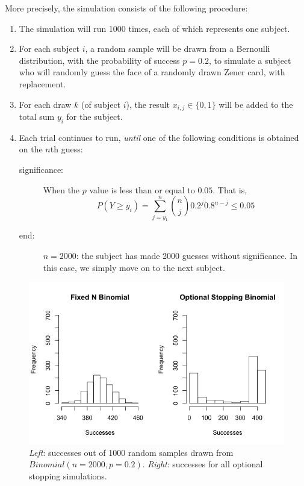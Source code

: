 More precisely, the simulation consists of the following procedure: 
\begin{enumerate}
	\item The simulation will run 1000 times, each of which represents one subject. 
	\item For each subject $i$, a random sample will be drawn from a Bernoulli distribution, with the probability of success $p=0.2$, to simulate a subject who will randomly guess the face of a randomly drawn Zener card, with replacement. 
	\item For each draw $k$ (of subject $i$), the result $x_{i,j}\in \{0,1\}$ will be added to the total sum $y_i$ for the subject.
	\item Each trial continues to run, \emph{until} one of the following conditions is obtained on the $n$th guess:\begin{description}
		\item[significance:] When the $p$ value is less than or equal to $0.05$. That is, 
		$$P(Y\geq y_i) = \sum_{j=y_1}^n {n \choose j} 0.2^j 0.8^{n-j}\leq 0.05$$
		\item[end:] $n=2000$: the subject has made 2000 guesses without significance. In this case, we simply move on to the next subject.
	\end{description} 
\end{enumerate}

\begin{figure}[h] 
\begin{center}
\includegraphics[scale=0.5]{fixedvsoptionalsuc.png}
	\caption{\emph{Left}: successes out of 1000 random samples drawn from $Binomial(n=2000,p=0.2)$. \emph{Right}: successes for all optional stopping simulations.}
	\label{fig:freqhistsuc}
\end{center}	
\end{figure}


